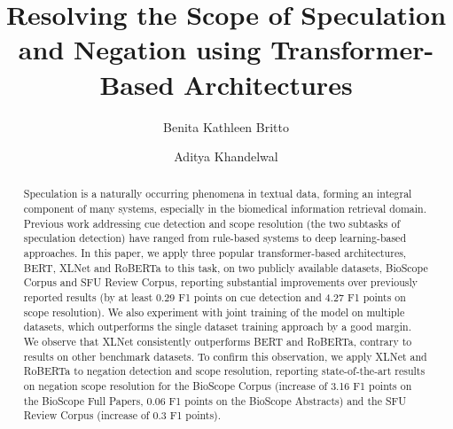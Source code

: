 \documentclass[runningheads]{llncs}
\begin{document}
\title{Resolving the Scope of Speculation and Negation using Transformer-Based Architectures}
\author{Benita Kathleen Britto \and
Aditya Khandelwal}
\maketitle              \begin{abstract}
Speculation is a naturally occurring phenomena in textual data, forming an integral component of many systems, especially in the biomedical information retrieval domain. Previous work addressing cue detection and scope resolution (the two subtasks of speculation detection) have ranged from rule-based systems to deep learning-based approaches. In this paper, we apply three popular transformer-based architectures, BERT, XLNet and RoBERTa to this task, on two publicly available datasets, BioScope Corpus and SFU Review Corpus, reporting substantial improvements over previously reported results (by at least 0.29 F1 points on cue detection and 4.27 F1 points on scope resolution). We also experiment with joint training of the model on multiple datasets, which outperforms the single dataset training approach by a good margin. We observe that XLNet consistently outperforms BERT and RoBERTa, contrary to results on other benchmark datasets. To confirm this observation, we apply XLNet and RoBERTa to negation detection and scope resolution, reporting state-of-the-art results on negation scope resolution for the BioScope Corpus (increase of 3.16 F1 points on the BioScope Full Papers, 0.06 F1 points on the BioScope Abstracts) and the SFU Review Corpus (increase of 0.3 F1 points).

\end{abstract}
\end{document}
